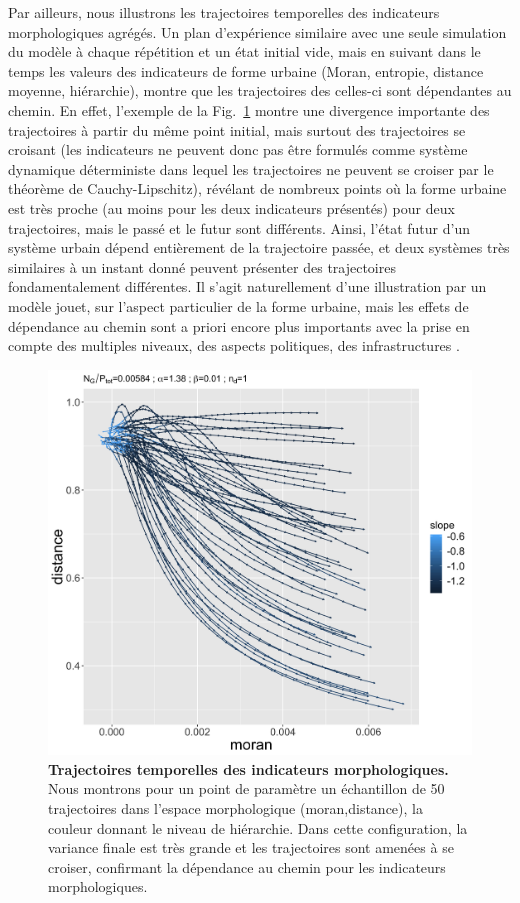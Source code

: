 \documentclass[11pt]{article}
\begin{document}
Par ailleurs, nous illustrons les trajectoires temporelles des indicateurs morphologiques agrégés. Un plan d'expérience similaire avec une seule simulation du modèle à chaque répétition et un état initial vide, mais en suivant dans le temps les valeurs des indicateurs de forme urbaine (Moran, entropie, distance moyenne, hiérarchie), montre que les trajectoires des celles-ci sont dépendantes au chemin. En effet, l'exemple de la Fig.~\ref{fig:morphotraj} montre une divergence importante des trajectoires à partir du même point initial, mais surtout des trajectoires se croisant (les indicateurs ne peuvent donc pas être formulés comme système dynamique déterministe dans lequel les trajectoires ne peuvent se croiser par le théorème de Cauchy-Lipschitz), révélant de nombreux points où la forme urbaine est très proche (au moins pour les deux indicateurs présentés) pour deux trajectoires, mais le passé et le futur sont différents. Ainsi, l'état futur d'un système urbain dépend entièrement de la trajectoire passée, et deux systèmes très similaires à un instant donné peuvent présenter des trajectoires fondamentalement différentes. Il s'agit naturellement d'une illustration par un modèle jouet, sur l'aspect particulier de la forme urbaine, mais les effets de dépendance au chemin sont a priori encore plus importants avec la prise en compte des multiples niveaux, des aspects politiques, des infrastructures \citep{pumain2012urban}.



\begin{figure}
	\centering
	\includegraphics[width=0.7\linewidth]{figures/trajs_moran-dist_seed8578.png}
	\caption{\textbf{Trajectoires temporelles des indicateurs morphologiques.} Nous montrons pour un point de paramètre un échantillon de 50 trajectoires dans l'espace morphologique (moran,distance), la couleur donnant le niveau de hiérarchie. Dans cette configuration, la variance finale est très grande et les trajectoires sont amenées à se croiser, confirmant la dépendance au chemin pour les indicateurs morphologiques.}
	\label{fig:morphotraj}
\end{figure}
\end{document}
